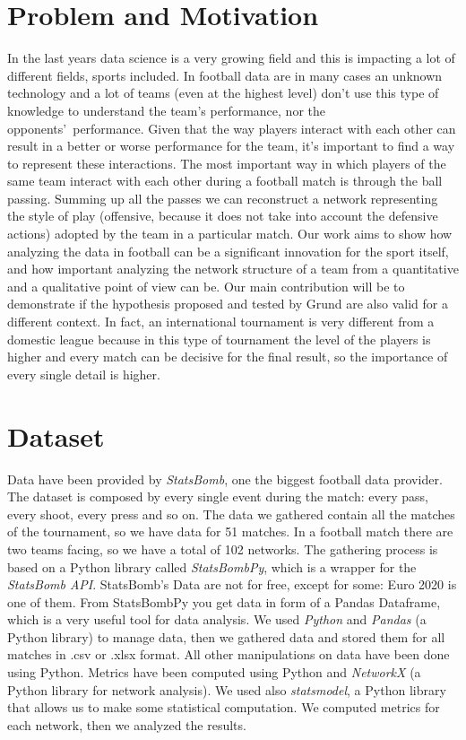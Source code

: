 \documentclass[12pt, a4paper]{article}
\begin{document}
\section{Problem and Motivation}
\label{problem-and-motivation}
In the last years data science is a very growing field and this is impacting a lot of different fields, sports included. In football data are in many cases an unknown technology and a lot of teams (even at the highest level) don’t use this type of knowledge to understand the team’s performance, nor the opponents’ performance. Given that the way players interact with each other can result in a better or worse performance for the team, it's important to find a way to represent these interactions. The most important way in which players of the same team interact with each other during a football match is through the ball passing. Summing up all the passes we can reconstruct a network representing the style of play (offensive, because it does not take into account the defensive actions) adopted by the team in a particular match. Our work aims to show how analyzing the data in football can be a significant innovation for the sport itself, and how important analyzing the network structure of a team from a quantitative and a qualitative point of view can be. Our main contribution will be to demonstrate if the hypothesis proposed and tested by Grund \cite{GRUND} are also valid for a different context. In fact, an international tournament is very different from a domestic league because in this type of tournament the level of the players is higher and every match can be decisive for the final result, so the importance of every single detail is higher.  


\section{Dataset}
\label{dataset}
Data have been provided by \emph{StatsBomb}, one the biggest football data provider. The dataset is composed by every single event during the match: every pass, every shoot, every press and so on. The data we gathered contain all the matches of the tournament, so we have data for 51 matches. In a football match there are two teams facing, so we have a total of 102 networks. 
The gathering process is based on a Python library called \emph{StatsBombPy}, which is a wrapper for the \emph{StatsBomb API}. 
StatsBomb's Data are not for free, except for some: Euro 2020 is one of them. From StatsBombPy you get data in form of a Pandas Dataframe, which is a very useful tool for data analysis. We used \emph{Python} and \emph{Pandas} (a Python library) to manage data, then we gathered data and stored them for all matches in .csv or .xlsx format. All other manipulations on data have been done using Python. Metrics have been computed using Python and \emph{NetworkX} (a Python library for network analysis). We used also \emph{statsmodel}, a Python library that allows us to make some statistical computation.  We computed metrics for each network, then we analyzed the results.
\end{document}
